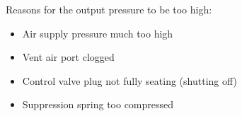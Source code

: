 \vskip 10pt

Reasons for the output pressure to be too high:

\begin{itemize}
\item{} Air supply pressure much too high
\item{} Vent air port clogged
\item{} Control valve plug not fully seating (shutting off)
\item{} Suppression spring too compressed
\end{itemize}











